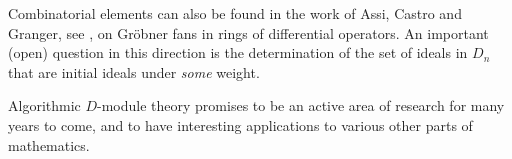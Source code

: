 Combinatorial elements can also be found in the work of Assi, Castro
and Granger, see \cite{DM:ACG1,DM:ACG2}, 
on Gr\"obner fans in rings of differential
operators. An important (open) question in this direction is the
determination of the set of ideals in $D_n$ that are initial ideals
under {\em some} weight.



Algorithmic $D$-module theory promises to be an active
area of research for many years to come, and to have interesting
applications to various other parts of mathematics.




